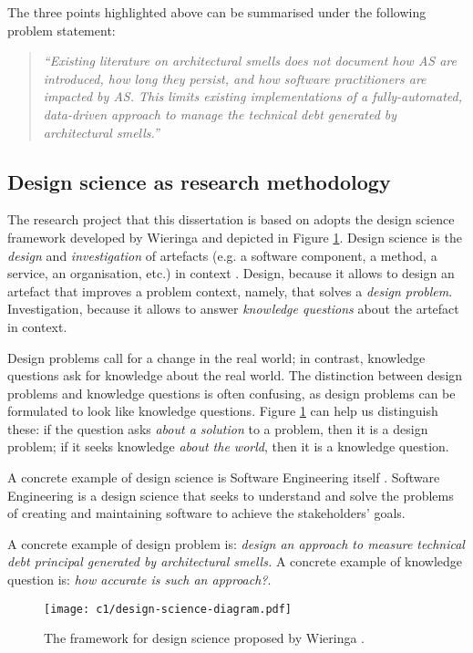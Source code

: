 The three points highlighted above can be summarised under the following problem statement:
\begin{quote}\itshape
    ``Existing literature on architectural smells does not document how AS are introduced, how long they persist, and how software practitioners are impacted by AS. 
    This limits existing implementations of a fully-automated, data-driven approach to manage the technical debt generated by architectural smells.''
\end{quote}

\subsection{Design science as research methodology}
The research project that this dissertation is based on adopts the design science framework developed by Wieringa \cite{Wieringa2014} and depicted in Figure \ref{fig:design-science}.
Design science is the \emph{design} and \emph{investigation} of artefacts (e.g. a software component, a method, a service, an organisation, etc.) in context \cite{Wieringa2014}.
Design, because it allows to design an artefact that improves a problem context, namely, that solves a \emph{design problem}. 
Investigation, because it allows to answer \emph{knowledge questions} about the artefact in context.

Design problems call for a change in the real world; in contrast, knowledge questions ask for knowledge about the real world.
The distinction between design problems and knowledge questions is often confusing, as design problems can be formulated to look like knowledge questions.
Figure \ref{fig:design-science} can help us distinguish these: if the question asks  \emph{about a solution} to a problem, then it is a design problem; if it seeks knowledge \emph{about the world}, then it is a knowledge question.

A concrete example of design science is Software Engineering itself \cite{Wieringa2014}.
Software Engineering is a design science that seeks to understand and solve the problems of creating and maintaining software to achieve the stakeholders' goals.

A concrete example of design problem is: \emph{design an approach to measure technical debt principal generated by architectural smells.}
A concrete example of knowledge question is: \emph{how accurate is such an approach?}.

\begin{figure}
    \centering
    \texttt{[image: c1/design-science-diagram.pdf]}
    \caption{The framework for design science proposed by Wieringa \cite{Wieringa2014}.}\label{fig:design-science}
\end{figure}

